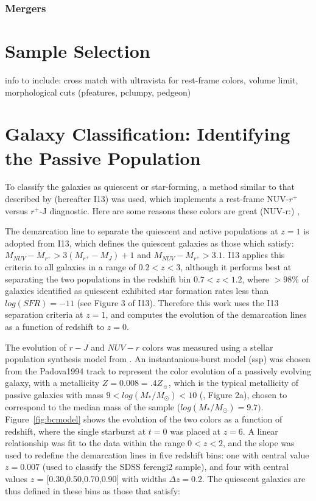\subsubsection{Mergers}

\section{Sample Selection}
\label{sec:reddisksample}
info to include:
cross match with ultravista for rest-frame colors, volume limit, morphological cuts (pfeatures, pclumpy, pedgeon)

\section{Galaxy Classification: Identifying the Passive Population}
\label{sec:colorcolor}
To classify the galaxies as quiescent or star-forming, a method similar to that described by \citet{Ilbert2013} (hereafter I13) was used, which implements a rest-frame NUV-$r^{+}$ versus $r^{+}$-J diagnostic. Here are some reasons these colors are great (NUV-r:) \citep{Arnouts2007a,Salim2005a,Wyder2007},\citep{Martin2007}

The demarcation line to separate the quiescent and active populations at $z=1$ is adopted from I13, which defines the quiescent galaxies as those which satisfy: $M_{NUV}-M_{r^{+}} > 3(M_{r^{+}}-M_{J})+1$ and $M_{NUV}-M_{r^{+}} > 3.1$. I13 applies this criteria to all galaxies in a range of $0.2<z<3$, although it performs best at separating the two populations in the redshift bin $0.7<z<1.2$, where $>98\%$ of galaxies identified as quiescent exhibited star formation rates less than $log(SFR) = -11$ (see Figure 3 of I13). Therefore this work uses the I13 separation criteria at $z=1$, and computes the evolution of the demarcation lines as a function of redshift to $z=0$. 

The evolution of $r-J$ and $NUV-r$ colors was measured using a stellar population synthesis model from \citet{Bruzual2003}. An instantanious-burst model (ssp) was chosen from the Padova1994 track to represent the color evolution of a passively evolving galaxy, with a metallicity $Z=0.008=.4Z_{\sun}$, which is the typical metallicity of passive galaxies with mass $9 < log(M_{*}/M_{\odot}) < 10$ (\citet{Peng2015}, Figure 2a), chosen to correspond to the median mass of the sample ($log(M_{*}/M_{\odot})=9.7)$. Figure~\ref{fig:bcmodel} shows the evolution of the two colors as a function of redshift, where the single starburst at $t=0$ was placed at $z=6$. A linear relationship was fit to the data within the range $0<z<2$, and the slope was used to redefine the demarcation lines in five redshift bins: one with central value $z=0.007$ (used to classify the SDSS ferengi2 sample), and four with central values $z$ = [0.30,0.50,0.70,0.90] with widths $\Delta z=0.2$. The quiescent galaxies are thus defined in these bins as those that satisfy:

